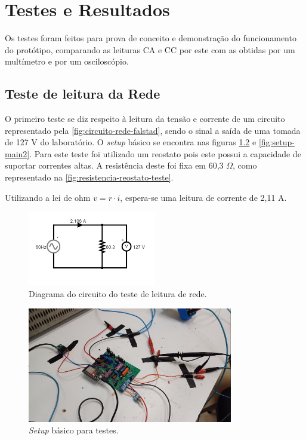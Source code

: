 
\chapter{Testes e Resultados}\label{cap:resultados}

Os testes foram feitos para prova de conceito e demonstração do funcionamento do protótipo, comparando as leituras \gls{CA} e \gls{CC} por este com as obtidas por um multímetro e por um osciloscópio.

\section{Teste de leitura da Rede}\label{sec:l-rede}

O primeiro teste se diz respeito à leitura da tensão e corrente de um circuito representado pela \autoref{fig:circuito-rede-falstad}, sendo o sinal a saída de uma tomada de 127 V do laboratório. O \textit{setup} básico se encontra nas figuras \ref{fig:setup-main} e \ref{fig:setup-main2}. Para este teste foi utilizado um reostato pois este possui a capacidade de suportar correntes altas. A resistência deste foi fixa em 60,3 $\Omega$, como representado na \autoref{fig:resistencia-reostato-teste}.

Utilizando a lei de ohm $v = r \cdot  i$, espera-se uma leitura de corrente de 2,11 A.

\begin{figure}[htb!]
    \caption{Diagrama do circuito do teste de leitura de rede.}
    \label{fig:circuito-rede-falstad}
    \includegraphics[width=0.5\textwidth]{figuras/circ-rede-falstad.png}
    \fonte{}
\end{figure}

\begin{figure}[htb!]
    \caption{\textit{Setup} básico para testes.}
    \label{fig:setup-main}
    \includegraphics[width=0.8\textwidth]{figuras/setup-basico.png}
    \fonte{}
\end{figure}

